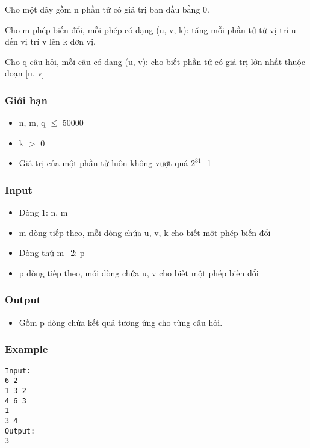



   Cho một dãy gồm n phần tử có giá trị ban đầu bằng 0.  

   Cho m phép biến đổi, mỗi phép có dạng (u, v, k): tăng mỗi phần tử từ vị trí u đến vị trí v lên k đơn vị.  

   Cho q câu hỏi, mỗi câu có dạng (u, v): cho biết phần tử có giá trị lớn nhất thuộc đoạn [u, v]  

\subsubsection{   Giới hạn  }
\begin{itemize}
	\item     n, m, q  $\le$  50000   
	\item     k $>$ 0   
	\item     Giá trị của một phần tử luôn không vượt quá $2^{31}$    -1   
\end{itemize}

\subsubsection{   Input  }
\begin{itemize}
	\item     Dòng 1: n, m   
	\item     m dòng tiếp theo, mỗi dòng chứa u, v, k cho biết một phép biến đổi   
	\item     Dòng thứ m+2: p   
	\item     p dòng tiếp theo, mỗi dòng chứa u, v cho biết một phép biến đổi    



\end{itemize}

\subsubsection{   Output  }
\begin{itemize}
	\item     Gồm p dòng chứa kết quả tương ứng cho từng câu hỏi.   
\end{itemize}

\subsubsection{   Example  }
\begin{verbatim}
Input:
6 2
1 3 2
4 6 3
1
3 4
Output:
3
\end{verbatim}
